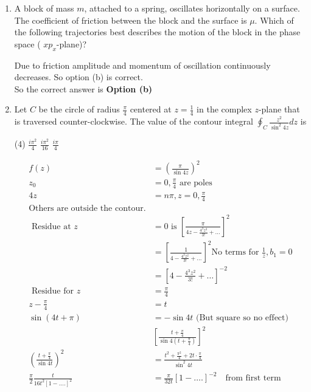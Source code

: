 \begin{enumerate}
\item A block of mass $m$, attached to a spring, oscillates horizontally on a surface. The coefficient of friction between the block and the surface is $\mu$. Which of the following trajectories best describes the motion of the block in the phase space ( $x p_{x}$-plane)?	
\begin{answer}
 Due to friction amplitude and momentum of oscillation continuously decreases. So option (b) is correct.\\
	So the correct answer is \textbf{Option (b)}
\end{answer}
\item Let $C$ be the circle of radius $\frac{\pi}{4}$ centered at $z=\frac{1}{4}$ in the complex $z$-plane that is traversed counter-clockwise. The value of the contour integral $\oint_{C} \frac{z^{2}}{\sin ^{2} 4 z} d z$ is
 \begin{tasks}(4)
	\task[\textbf{b.}]$\frac{i \pi^{2}}{4}$
	\task[\textbf{c.}] $\frac{i \pi^{2}}{16}$
	\task[\textbf{d.}] $\frac{i \pi}{4}$
\end{tasks}
\begin{answer}
	\begin{align*}
	f(z)&=\left(\frac{\pi}{\sin 4 z}\right)^{2}\\
	z_{0}&=0, \frac{\pi}{4}\text{ are poles}\\
	4 z&=n \pi, z=0, \frac{\pi}{4}\\
	\text{Others are outside the contour.}\\
	\text { Residue at } z&=0 \text { is }\left[\frac{\pi}{4 z-\frac{4^{3} z^{3}}{3 !}+\ldots}\right]^{2}\\
	&=\left[\frac{1}{4-\frac{4^{3} z^{2}}{3 !}+\ldots}\right]^{2}
	\text{No terms for $\frac{1}{z}, b_{1}=0$}\\
	&=\left[4-\frac{4^{3} z^{2}}{3 !}+\ldots\right]^{-2}\\
\text{	Residue for }z&=\frac{\pi}{4}\\
	z-\frac{\pi}{4}&=t\\
	\sin (4 t+\pi)&=-\sin 4 t
\text{	(But square so no effect)}\\
&\left[\frac{t+\frac{\pi}{4}}{\sin 4\left(t+\frac{\pi}{4}\right)}\right]^{2}\\
\left(\frac{t+\frac{\pi}{4}}{\sin 4 t}\right)^{2}&=\frac{t^{2}+\frac{\pi^{2}}{4}+2 t \cdot \frac{\pi}{4}}{\sin ^{2} 4 t} \\
\frac{\pi}{2} \frac{t}{16 t^{2}[1-\ldots .]^{2}}&=\frac{\pi}{32 t}[1-\ldots .]^{-2} \quad \text{from first term}\\

\end{align*}
\end{answer}
\end{enumerate}
